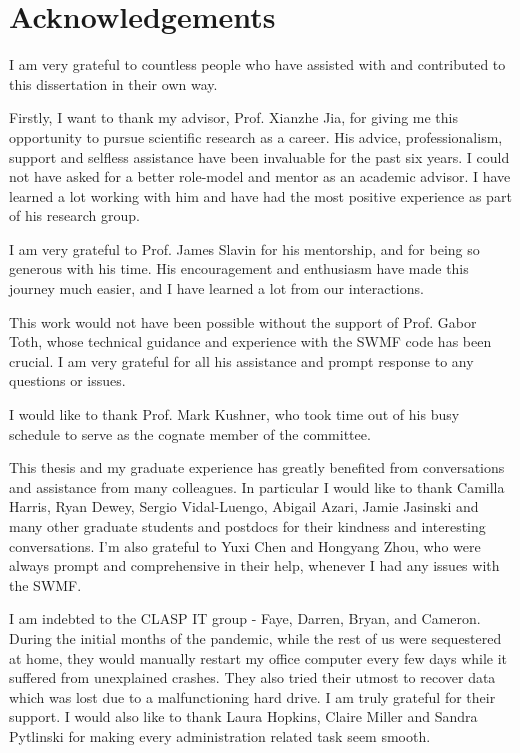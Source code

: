 \chapter{Acknowledgements}

I am very grateful to countless people who have assisted with and contributed to this dissertation in their own way.

Firstly, I want to thank my advisor, Prof. Xianzhe Jia, for giving me this opportunity to pursue scientific research as a career. His advice, professionalism, support and selfless assistance have been invaluable for the past six years. I could not have asked for a better role-model and mentor as an academic advisor. I have learned a lot working with him and have had the most positive experience as part of his research group. 

I am very grateful to Prof. James Slavin for his mentorship, and for being so generous with his time. His encouragement and enthusiasm have made this journey much easier, and I have learned a lot from our interactions. 

This work would not have been possible without the support of Prof. Gabor Toth, whose technical guidance and experience with the SWMF code has been crucial. I am very grateful for all his assistance and prompt response to any questions or issues.

I would like to thank Prof. Mark Kushner, who took time out of his busy schedule to serve as the cognate member of the committee. 

This thesis and my graduate experience has greatly benefited from conversations and assistance from many colleagues. In particular I would like to thank Camilla Harris, Ryan Dewey, Sergio Vidal-Luengo, Abigail Azari, Jamie Jasinski and many other graduate students and postdocs for their kindness and interesting conversations. I'm also grateful to Yuxi Chen and Hongyang Zhou, who were always prompt and comprehensive in their help, whenever I had any issues with the SWMF.  

I am indebted to the CLASP IT group - Faye, Darren, Bryan, and Cameron. During the initial months of the pandemic, while the rest of us were sequestered at home, they would manually restart my office computer every few days while it suffered from unexplained crashes. They also tried their utmost to recover data which was lost due to a malfunctioning hard drive. I am truly grateful for their support. I would also like to thank Laura Hopkins, Claire Miller and Sandra Pytlinski for making every administration related task seem smooth. 

